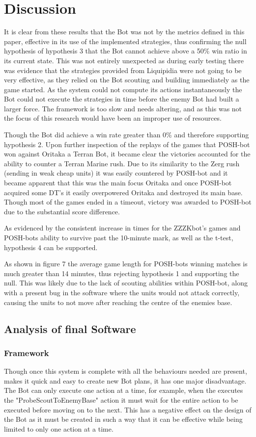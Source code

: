 \documentclass[journal]{IEEEtran}
\begin{document}
	\section{Discussion}
	It is clear from these results that the Bot was not by the metrics defined in this paper, effective in its use of the implemented strategies, thus confirming the null hypothesis of hypothesis 3 that the Bot cannot achieve above a 50\% win ratio in its current state. This was not entirely unexpected as during early testing there was evidence that the strategies provided from Liquipidia were not going to be very effective, as they relied on the Bot scouting and building immediately as the game started. As the system could not compute its actions instantaneously the Bot could not execute the strategies in time before the enemy Bot had built a larger force. The framework is too slow and needs altering, and as this was not the focus of this research would have been an improper use of resources.
	
	Though the Bot did achieve a win rate greater than 0\% and therefore supporting hypothesis 2. Upon further inspection of the replays of the games that POSH-bot won against Oritaka a Terran Bot, it became clear the victories accounted for the ability to counter a Terran Marine rush. Due to its similarity to the Zerg rush (sending in weak cheap units) it was easily countered by POSH-bot and it became apparent that this was the main focus Oritaka and once POSH-bot acquired some DT's it easily overpowered Oritaka and destroyed its main base. Though most of the games ended in a timeout, victory was awarded to POSH-bot due to the substantial score difference.
	
	As evidenced by the consistent increase in times for the ZZZKbot's games and POSH-bots ability to survive past the 10-minute mark, as well as the t-test, hypothesis 4 can be supported. 
	
	As shown in figure 7 the average game length for POSH-bots winning matches is much greater than 14 minutes, thus rejecting hypothesis 1 and supporting the null. This was likely due to the lack of scouting abilities within POSH-bot, along with a present bug in the software where the units would not attack correctly, causing the units to not move after reaching the centre of the enemies base. 
	
	\subsection{Analysis of final Software}
	\subsubsection{Framework}
	Though once this system is complete with all the behaviours needed are present, makes it quick and easy to create new Bot plans, it has one major disadvantage. The Bot can only execute one action at a time, for example, when the executes the "ProbeScoutToEnemyBase" action it must wait for the entire action to be executed before moving on to the next. This has a negative effect on the design of the Bot as it must be created in such a way that it can be effective while being limited to only one action at a time.
	
\end{document}
